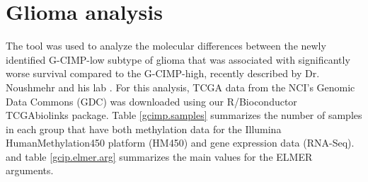 
\section{Glioma analysis}

The  tool was used to analyze the molecular differences between the newly identified G-CIMP-low subtype of glioma that was associated with significantly worse survival compared to the G-CIMP-high, recently described by Dr. Noushmehr and his lab \cite{ceccarelli2016molecular}. 
For this analysis, TCGA data from the NCI's Genomic Data Commons (GDC) was downloaded using our R/Bioconductor TCGAbiolinks package. Table \ref{gcimp.samples} summarizes the number of samples in each group that have both  methylation data for the Illumina HumanMethylation450 platform (HM450) and gene expression data
(RNA-Seq). and table \ref{gcip.elmer.arg} summarizes the main values for the ELMER arguments.

